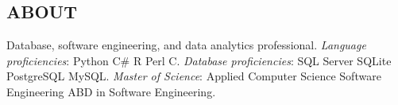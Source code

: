 \documentclass[margin, 10pt]{res} %
\begin{document}
\begin{resume}

 
\section{ABOUT}  

    Database, software engineering, and data analytics professional. 
    \textit{Language proficiencies}:  Python \textpipe{}  C\# \textpipe{}   \textsf{R} \textpipe{}      Perl \textpipe{}    C. 
    \textit{Database proficiencies}: SQL Server \textpipe{}    SQLite \textpipe{}    PostgreSQL \textpipe{}    MySQL. 
    \textit{Master of Science}: Applied Computer Science \textpipe{}    Software Engineering \textpipe{}   
    ABD in Software Engineering. 





\end{resume}
\end{document}

